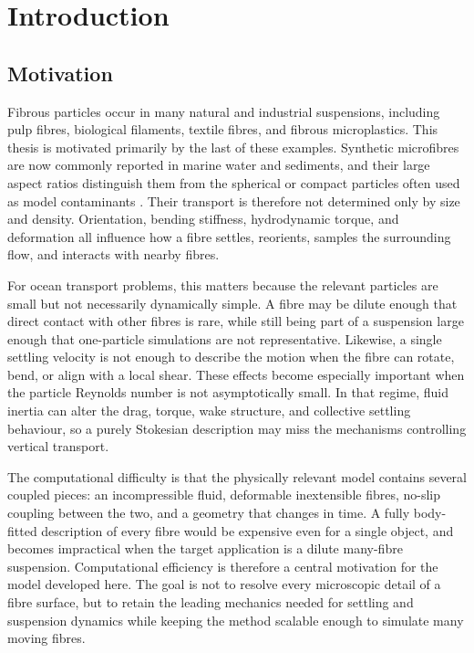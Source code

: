 \chapter{Introduction}
\label{chap:introduction}

\section{Motivation}

Fibrous particles occur in many natural and industrial suspensions, including
pulp fibres, biological filaments, textile fibres, and fibrous microplastics.
This thesis is motivated primarily by the last of these examples. Synthetic
microfibres are now commonly reported in marine water and sediments, and their
large aspect ratios distinguish them from the spherical or compact particles
often used as model contaminants \cite{gago_synthetic_2018}. Their transport is
therefore not determined only by size and density. Orientation, bending
stiffness, hydrodynamic torque, and deformation all influence how a fibre
settles, reorients, samples the surrounding flow, and interacts with nearby
fibres.

For ocean transport problems, this matters because the relevant particles are
small but not necessarily dynamically simple. A fibre may be dilute enough that
direct contact with other fibres is rare, while still being part of a
suspension large enough that one-particle simulations are not representative.
Likewise, a single settling velocity is not enough to describe the motion when
the fibre can rotate, bend, or align with a local shear. These effects become
especially important when the particle Reynolds number is not asymptotically
small. In that regime, fluid inertia can alter the drag, torque, wake
structure, and collective settling behaviour, so a purely Stokesian description
may miss the mechanisms controlling vertical transport.

The computational difficulty is that the physically relevant model contains
several coupled pieces: an incompressible fluid, deformable inextensible
fibres, no-slip coupling between the two, and a geometry that changes in time.
A fully body-fitted description of every fibre would be expensive even for a
single object, and becomes impractical when the target application is a dilute
many-fibre suspension. Computational efficiency is therefore a central
motivation for the model developed here. The goal is not to resolve every
microscopic detail of a fibre surface, but to retain the leading mechanics
needed for settling and suspension dynamics while keeping the method scalable
enough to simulate many moving fibres.

